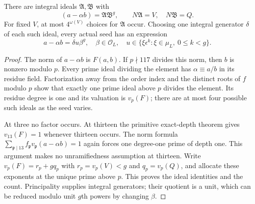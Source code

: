 \begin{theorem}
There are integral ideals $\mathfrak A,\mathfrak B$ with
\[
 (a-\alpha b)=\mathfrak A\mathfrak B^g,
 \qquad N\mathfrak A=V,\quad N\mathfrak B=Q.
\]
For fixed $V$, at most $4^{\omega(V)}$ choices for $\mathfrak A$ occur.
Choosing one integral generator $\delta$ of each such ideal, every actual
seed has an expression
\[
 a-\alpha b=\delta u\beta^g,
 \quad\beta\in\mathcal O_L,\quad
 u\in\{\xi\epsilon^k:\xi\in\mu_L,\ 0\le k<g\}.
\]
\end{theorem}
\begin{proof}
The norm of $a-\alpha b$ is $F(a,b)$. If $p\nmid117$ divides this
norm, then $b$ is nonzero modulo $p$. Every prime ideal dividing the
element has $\alpha\equiv a/b$ in its residue field. Factorization away
from the order index and the distinct roots of $f$ modulo $p$ show
that exactly one prime ideal above $p$ divides the element. Its residue
degree is one and its valuation is $v_p(F)$; there are at most four
possible such ideals as the seed varies.

At three no factor occurs. At thirteen the primitive exact-depth
theorem gives $v_{13}(F)=1$ whenever thirteen occurs. The norm formula
$\sum_{\mathfrak p\mid13}f_{\mathfrak p}v_{\mathfrak p}(a-\alpha b)=1$
again forces one degree-one prime of depth one. This argument makes no
unramifiedness assumption at thirteen. Write
$v_p(F)=r_p+gq_p$ with $r_p=v_p(V)<g$ and $q_p=v_p(Q)$, and allocate
these exponents at the unique prime above $p$. This proves the ideal
identities and the count. Principality supplies integral generators;
their quotient is a unit, which can be reduced modulo unit $g$th powers
by changing $\beta$.
\end{proof}

